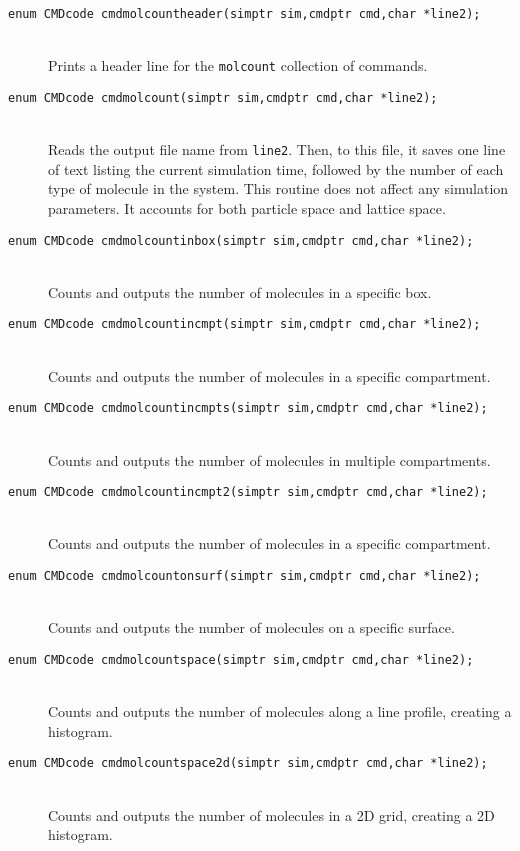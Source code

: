 \documentclass {scrbook}
\newcommand {\ttt} {\texttt}
\begin{document}
\begin{description}
\item[\ttt{enum CMDcode cmdmolcountheader(simptr sim,cmdptr cmd,char *line2);}]
\hfill \\
Prints a header line for the \ttt{molcount} collection of commands.

\item[\ttt{enum CMDcode cmdmolcount(simptr sim,cmdptr cmd,char *line2);}]
\hfill \\
Reads the output file name from \ttt{line2}. Then, to this file, it saves one line of text listing the current simulation time, followed by the number of each type of molecule in the system. This routine does not affect any simulation parameters. It accounts for both particle space and lattice space.

\item[\ttt{enum CMDcode cmdmolcountinbox(simptr sim,cmdptr cmd,char *line2);}]
\hfill \\
Counts and outputs the number of molecules in a specific box.

\item[\ttt{enum CMDcode cmdmolcountincmpt(simptr sim,cmdptr cmd,char *line2);}]
\hfill \\
Counts and outputs the number of molecules in a specific compartment.

\item[\ttt{enum CMDcode cmdmolcountincmpts(simptr sim,cmdptr cmd,char *line2);}]
\hfill \\
Counts and outputs the number of molecules in multiple compartments.

\item[\ttt{enum CMDcode cmdmolcountincmpt2(simptr sim,cmdptr cmd,char *line2);}]
\hfill \\
Counts and outputs the number of molecules in a specific compartment.

\item[\ttt{enum CMDcode cmdmolcountonsurf(simptr sim,cmdptr cmd,char *line2);}]
\hfill \\
Counts and outputs the number of molecules on a specific surface.

\item[\ttt{enum CMDcode cmdmolcountspace(simptr sim,cmdptr cmd,char *line2);}]
\hfill \\
Counts and outputs the number of molecules along a line profile, creating a histogram.

\item[\ttt{enum CMDcode cmdmolcountspace2d(simptr sim,cmdptr cmd,char *line2);}]
\hfill \\
Counts and outputs the number of molecules in a 2D grid, creating a 2D histogram.


\end{description}
\end{document}
